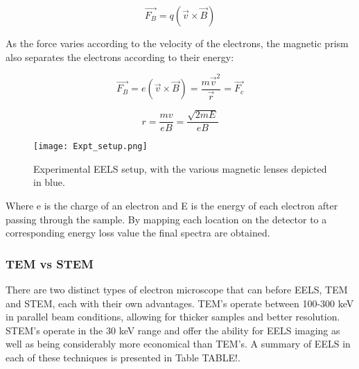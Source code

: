 \begin{equation}
	\vec{F_B} = q (\vec{v} \times \vec{B})
\end{equation}

As the force varies according to the velocity of the electrons, the magnetic prism also separates the electrons according to their energy: 

\begin{equation}
\vec{F_B} = e (\vec{v} \times \vec{B}) =  \frac{m \vec{v}^2}{\vec{r}} = \vec{F_c} 
\end{equation}

 
 
\begin{equation} 
 r =  \frac{mv}{eB} = \frac{\sqrt{2mE}}{eB}
\end{equation}


\begin{figure}
 \centering
 \texttt{[image: Expt\_setup.png]}
 \caption{Experimental EELS setup, with the various magnetic lenses depicted in blue.  }
 
\end{figure}

Where e is the charge of an electron and E is the energy of each electron after passing through the sample.  By mapping each location on the detector to a corresponding energy loss value the final spectra are obtained.  

\subsubsection{TEM vs STEM}
There are two distinct types of electron microscope that can before EELS, TEM and STEM, each with their own advantages.  TEM's operate between 100-300 keV in parallel beam conditions, allowing for thicker samples and better resolution.  STEM's operate in the 30 keV range and offer the ability for EELS imaging as well as being considerably more economical than TEM's.  A summary of EELS in each of these techniques is presented in Table TABLE!.  

